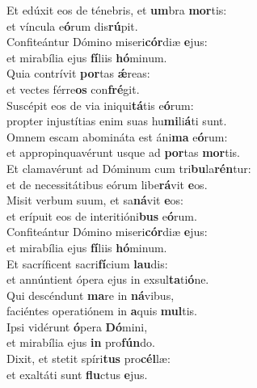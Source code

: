 \evenverse Et edúxit eos de ténebris, et \textbf{um}bra \textbf{mor}tis:~\*\\
\evenverse et víncula e\textbf{ó}rum dis\textbf{rú}pit.\\
\oddverse Confiteántur Dómino miseri\textbf{cór}diæ \textbf{e}jus:~\*\\
\oddverse et mirabília ejus \textbf{fí}liis \textbf{hó}minum.\\
\evenverse Quia contrívit \textbf{por}tas \textbf{ǽ}reas:~\*\\
\evenverse et vectes férre\textbf{os} con\textbf{fré}git.\\
\oddverse Suscépit eos de via iniqui\textbf{tá}tis e\textbf{ó}rum:~\*\\
\oddverse propter injustítias enim suas hu\textbf{mi}li\textbf{á}ti sunt.\\
\evenverse Omnem escam abomináta est áni\textbf{ma} e\textbf{ó}rum:~\*\\
\evenverse et appropinquavérunt usque ad \textbf{por}tas \textbf{mor}tis.\\
\oddverse Et clamavérunt ad Dóminum cum tri\textbf{bu}la\textbf{rén}tur:~\*\\
\oddverse et de necessitátibus eórum libe\textbf{rá}vit \textbf{e}os.\\
\evenverse Misit verbum suum, et sa\textbf{ná}vit \textbf{e}os:~\*\\
\evenverse et erípuit eos de interitióni\textbf{bus} e\textbf{ó}rum.\\
\oddverse Confiteántur Dómino miseri\textbf{cór}diæ \textbf{e}jus:~\*\\
\oddverse et mirabília ejus \textbf{fí}liis \textbf{hó}minum.\\
\evenverse Et sacríficent sacri\textbf{fí}cium \textbf{lau}dis:~\*\\
\evenverse et annúntient ópera ejus in exsul\textbf{ta}ti\textbf{ó}ne.\\
\oddverse Qui descéndunt \textbf{ma}re in \textbf{ná}vibus,~\*\\
\oddverse faciéntes operatiónem in \textbf{a}quis \textbf{mul}tis.\\
\evenverse Ipsi vidérunt \textbf{ó}pera \textbf{Dó}mini,~\*\\
\evenverse et mirabília ejus \textbf{in} pro\textbf{fún}do.\\
\oddverse Dixit, et stetit spíri\textbf{tus} pro\textbf{cél}læ:~\*\\
\oddverse et exaltáti sunt \textbf{flu}ctus \textbf{e}jus.\\

